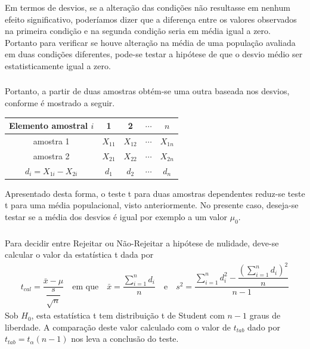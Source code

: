 \documentclass[14pt,aspectratio=1610]{beamer}
\newcommand{\bx}{\ensuremath{\bar{x}}}
\newcommand{\Ho}{\ensuremath{H_{0}}}
\begin{document}
\begin{frame}{}
\frametitle{}
\begin{block}{}
\justifying
Em termos de desvios, se a alteração das condições não resultasse em nenhum
efeito significativo, poderíamos dizer que a diferença entre os valores observados na
primeira condição e na segunda condição seria em média igual a zero. Portanto para
verificar se houve alteração na média de uma população avaliada em duas condições
diferentes, pode-se testar a hipótese de que o desvio médio ser estatisticamente igual a
zero.
\end{block}
\end{frame}

\begin{frame}{}
\frametitle{}
\begin{block}{}
\justifying
Portanto, a partir de duas amostras obtém-se uma outra baseada nos desvios, conforme é mostrado a seguir.
\begin{table}[]
\begin{tabular}{ccccc}
\hline \hline
Elemento amostral $i$& 1              &   2            & $\cdots$  & $n$ \\
\hline
amostra 1                    & $X_{11}$ & $X_{12}$ & $\cdots$ & $X_{1n}$ \\
amostra 2                    & $X_{21}$ & $X_{22}$ & $\cdots$ & $X_{2n}$ \\
\hline
 $d_{i}=X_{1i}-X_{2i}$& $d_{1}$   & $d_{2}$    & $\cdots$ & $d_{n}$\\
\hline
\end{tabular}
\end{table}
Apresentado desta forma, o teste t para duas amostras dependentes reduz-se teste t para uma média populacional, visto anteriormente. No presente caso, deseja-se testar
se a média dos desvios é igual por exemplo a um valor $\mu_{0}$.
\end{block}
\end{frame}

\begin{frame}{}
\frametitle{}
\begin{block}{}
\justifying
Para decidir entre Rejeitar ou Não-Rejeitar a hipótese de nulidade, deve-se calcular o valor da estatística t dada por
\begin{align*}
t_{cal}=\dfrac{\bx-\mu}{\dfrac{s}{\sqrt{n}}}\quad \textrm{em que}\quad \bx=\dfrac{\displaystyle \sum_{i=1}^{n}d_{i}}{n}\quad \textrm{e}\quad 
s^{2}=\dfrac{\displaystyle \sum_{i=1}^{n}d_{i}^{2}-\dfrac{(\displaystyle \sum_{i=1}^{n}d_{i})^{2}}{n}}{n-1}
\end{align*}
Sob $\Ho$, esta estatística t tem distribuição t de Student com $n-1$ graus de liberdade. A comparação deste valor calculado com o valor de $t_{tab}$ dado por 
$t_{tab}=t_{\alpha}(n-1)$ nos leva a conclusão do teste.
\end{block}
\end{frame}
\end{document}
